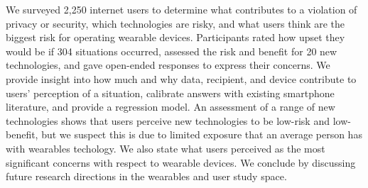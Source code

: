 \documentclass{acm_proc_article-sp}
\begin{document}
We surveyed 2,250 internet users to determine what contributes to a violation of privacy or security, which technologies are risky, and what users think are the biggest risk for operating wearable devices. Participants rated how upset they would be if 304 situations occurred, assessed the risk and benefit for 20 new technologies, and gave open-ended responses to express their concerns. We provide insight into how much and why data, recipient, and device contribute to users' perception of a situation, calibrate answers with existing smartphone literature, and provide a regression model. An assessment of a range of new technologies shows that users perceive new technologies to be low-risk and low-benefit, but we suspect this is due to limited exposure that an average person has with wearables techology. We also state what users perceived as the most significant concerns with respect to wearable devices. We conclude by discussing future research directions in the wearables and user study space. 







\end{document}
